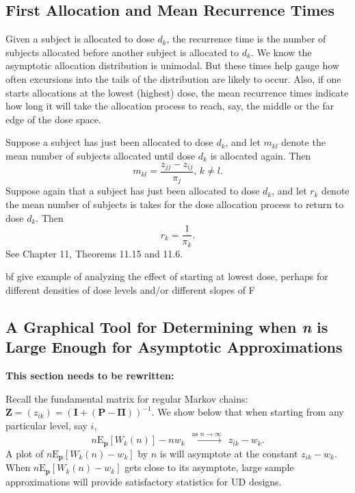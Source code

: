 \subsection{First Allocation and Mean Recurrence Times}
Given a subject is allocated to dose  $d_k$, the recurrence time  is the number of subjects allocated before another subject is allocated to $d_k$.  We know the asymptotic allocation distribution is unimodal.  But these times help gauge how often excursions into the tails of the distribution are likely to occur.   Also, if one starts allocations at the lowest (highest) dose, the mean recurrence times indicate how long it will take the allocation process to reach, say, the middle or the far edge of the dose space.

Suppose a subject has just been allocated to dose $d_k$, and let  $m_{kl}$ denote the mean number of subjects allocated until dose $d_k$ is allocated again.
Then $$m_{kl}=\frac{z_{jj}-z_{ij}}{\pi_j},\, k\ne l.$$
Suppose again that a subject has just been allocated to dose $d_k$, and let $r_k$ denote the mean number of subjects is takes for the dose allocation process to return to dose $d_k$.  Then $$r_k=\frac{1}{\pi_k}. $$
{See Chapter 11, Theorems 11.15 and 11.6}\cite{Grin:Snel:Intr:1997}.

{bf give example of analyzing the effect of starting at lowest dose, perhaps for different densities of dose levels and/or different slopes of F}

\subsection{ A Graphical Tool for Determining when {\em n} is Large Enough for Asymptotic Approximations}
{\bf This section needs to be rewritten:}

Recall the fundamental matrix for regular Markov chains:
 $\mathbf{Z}=\left(z_{ik}\right)=\left({\mathbf{I}}+\left({\mathbf{P}}
 -\boldsymbol{\Pi}\right)\right)^{-1}$.
  We show below that
when starting from any particular level, say $i$,
$$n\mathrm{E}_{\mathbf{p}}\left[W_k(n)\right]-nw_k \ \ \stackrel{\textrm{as } n
\rightarrow \infty}\longrightarrow\ \ z_{ik}-w_k. $$
A plot of $n\mathrm{E}_{\mathbf{p}}\left[W_k(n)-w_k\right]$ by $n$ is will asymptote at
the constant $z_{ik}-w_k$. When $n\mathrm{E}_{\mathbf{p}}\left[W_k(n)-w_k\right]$  gets close to its asymptote, large sample approximations will
provide satisfactory statistics for UD designs.

